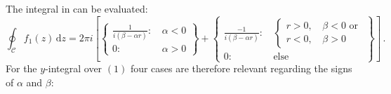 The integral in  can be evaluated:
\begin{equation}
   \oint_\mathcal{C} f_1(z) \,\mathrm{d}z
 = 2 \pi i \left[ \left\{ \begin{aligned}
                   \frac{1}{i(\beta-\alpha r)} :&\, \alpha<0 \\
                   0                           :&\, \alpha>0
                  \end{aligned} \right\}
                 +\left\{ \begin{aligned}
                   \frac{-1}{i(\beta-\alpha r)} :&\, \left\{\begin{aligned}
                                                       r>0,&\, \beta<0 \textrm{ or} \\
                                                       r<0,&\, \beta>0
                                                      \end{aligned} \right. \\
                   0                           :&\, \textrm{else}
                  \end{aligned} \right\}
 \right] \, .
\end{equation}
For the $y$-integral over $(1)$ four cases are therefore relevant regarding the signs of $\alpha$ and $\beta$:
